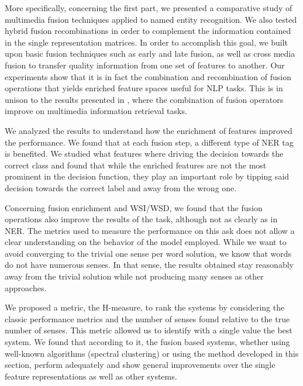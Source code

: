 More specifically, concerning the first part, we presented  a comparative study of multimedia fusion techniques applied to named entity recognition.  We also tested hybrid fusion recombinations in order to complement the information contained in the single representation matrices. In order to accomplish this goal, we built upon basic fusion techniques such as early and late fusion, as well as cross media fusion to transfer quality information from one set of features to another. Our experiments show that it is in fact the combination and recombination of fusion operations that yields enriched feature spaces useful for NLP tasks. This is in unison to the results presented in \cite{Ah-PineCC15}, where the combination of fusion operators improve on multimedia information retrieval tasks.


We analyzed the results to understand how the enrichment of features improved the performance. We found that at each fusion step, a different type of NER tag is benefited. We studied what features where driving the decision towards the correct class and found that while the enriched features are not the most prominent  in the decision function, they play an important role by tipping said decision towards the correct label and away from the wrong one. 

Concerning fusion enrichment and WSI/WSD, we found that the fusion operations also improve the results of the task, although not as clearly as in NER. The metrics used to measure the performance on this ask does not allow a clear understanding on the behavior of the model employed. While we want to avoid converging to the trivial one sense per word solution, we know that words do not have numerous senses. In that sense, the results obtained stay reasonably away from the trivial solution while not producing many senses as other approaches.

We proposed a metric, the H-measure, to rank the systems by considering the classic performance metrics and the number of senses found relative to the true number of senses. This metric allowed us to identify with a single value the best system. We found that according to it, the fusion based systems, whether using well-known algorithms (spectral clustering) or using the method developed in this section, perform adequately and show general improvements over the single feature representations as well as other systems.

